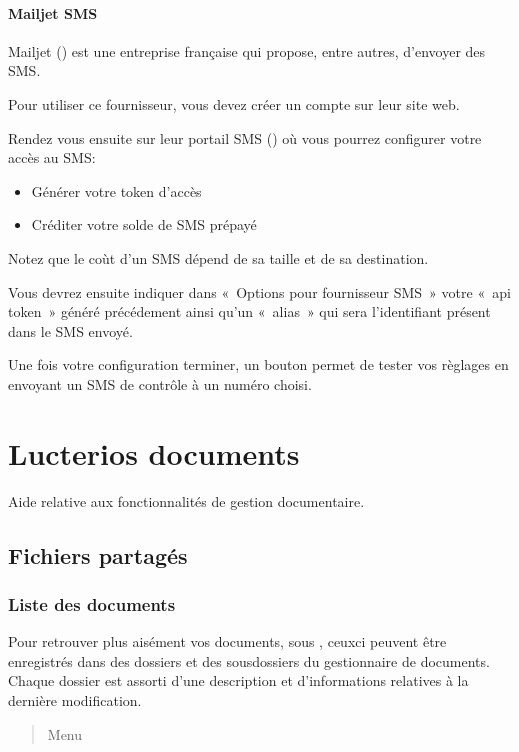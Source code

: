 \documentclass[a4paper,10pt,oneside,french]{sphinxmanual}
\begin{document}
\subsubsection{Mailjet SMS}
\label{\detokenize{mailing/configuration:mailjet-sms}}
Mailjet () est une entreprise française qui propose, entre autres, d’envoyer des SMS.

Pour utiliser ce fournisseur, vous devez créer un compte sur leur site web.

Rendez vous ensuite sur leur portail SMS () où vous pourrez configurer votre accès au SMS:
\begin{itemize}
\item {} 
Générer votre token d’accès

\item {} 
Créditer votre solde de SMS prépayé

\end{itemize}

Notez que le coùt d’un SMS dépend de sa taille et de sa destination.

Vous devrez ensuite indiquer dans « Options pour fournisseur SMS » votre « api token » généré précédement
ainsi qu’un « alias » qui sera l’identifiant présent dans le SMS envoyé.

Une fois votre configuration terminer, un bouton  permet de tester vos règlages en envoyant un SMS de contrôle à un numéro choisi.


\chapter{Lucterios documents}
\label{\detokenize{documents/index:lucterios-documents}}\label{\detokenize{documents/index::doc}}
Aide relative aux fonctionnalités de gestion documentaire.


\section{Fichiers partagés}
\label{\detokenize{documents/shared_document:fichiers-partages}}\label{\detokenize{documents/shared_document::doc}}

\subsection{Liste des documents}
\label{\detokenize{documents/shared_document:liste-des-documents}}
Pour retrouver plus aisément vos documents, sous , ceux\sphinxhyphen{}ci peuvent être enregistrés dans des dossiers et des sous\sphinxhyphen{}dossiers du gestionnaire de documents.
Chaque dossier est assorti d’une description et d’informations relatives à la dernière modification.
\begin{quote}

Menu 
\end{quote}
\end{document}
